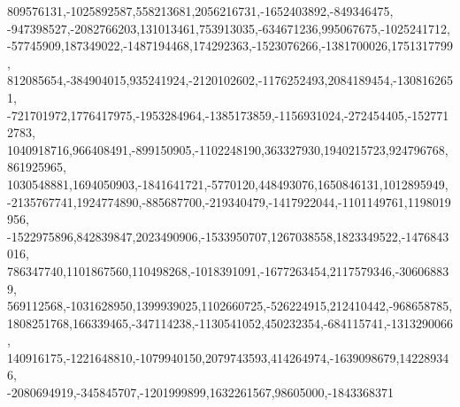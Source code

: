 \documentclass[a4paper,11pt]{article}
\begin{document}
\begin{appendices}
809576131,-1025892587,558213681,2056216731,-1652403892,-849346475,\\
-947398527,-2082766203,131013461,753913035,-634671236,995067675,-1025241712,\\
-57745909,187349022,-1487194468,174292363,-1523076266,-1381700026,1751317799,\\
812085654,-384904015,935241924,-2120102602,-1176252493,2084189454,-1308162651,\\
-721701972,1776417975,-1953284964,-1385173859,-1156931024,-272454405,-1527712783,\\
1040918716,966408491,-899150905,-1102248190,363327930,1940215723,924796768,861925965,\\
1030548881,1694050903,-1841641721,-5770120,448493076,1650846131,1012895949,\\
-2135767741,1924774890,-885687700,-219340479,-1417922044,-1101149761,1198019956,\\
-1522975896,842839847,2023490906,-1533950707,1267038558,1823349522,-1476843016,\\
786347740,1101867560,110498268,-1018391091,-1677263454,2117579346,-306068839,\\
569112568,-1031628950,1399939025,1102660725,-526224915,212410442,-968658785,\\
1808251768,166339465,-347114238,-1130541052,450232354,-684115741,-1313290066,\\
140916175,-1221648810,-1079940150,2079743593,414264974,-1639098679,142289346,\\
-2080694919,-345845707,-1201999899,1632261567,98605000,-1843368371



\end{appendices}
\end{document}
